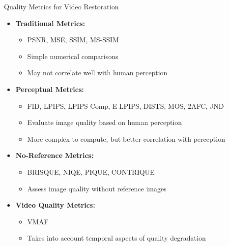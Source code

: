 \documentclass{beamer}
\begin{document}
\begin{frame}{Quality Metrics for Video Restoration}
\begin{itemize}
  \item \textbf{Traditional Metrics:}
  \begin{itemize}
    \item PSNR, MSE, SSIM, MS-SSIM
    \item Simple numerical comparisons
    \item May not correlate well with human perception
  \end{itemize}
  \item \textbf{Perceptual Metrics:}
  \begin{itemize}
    \item FID, LPIPS, LPIPS-Comp, E-LPIPS, DISTS, MOS, 2AFC, JND
    \item Evaluate image quality based on human perception
    \item More complex to compute, but better correlation with perception
  \end{itemize}
  \item \textbf{No-Reference Metrics:}
  \begin{itemize}
    \item BRISQUE, NIQE, PIQUE, CONTRIQUE
    \item Assess image quality without reference images
  \end{itemize}
  \item \textbf{Video Quality Metrics:}
  \begin{itemize}
    \item VMAF
    \item Takes into account temporal aspects of quality degradation
  \end{itemize}
  \end{itemize}
\end{frame}
\end{document}
